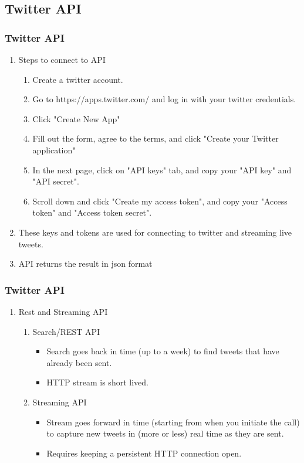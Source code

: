 \documentclass{beamer}
\begin{document}
\subsection{Twitter API}
\begin{frame}
\frametitle{Twitter API}
\begin{enumerate}
\item Steps to connect to API
\begin{enumerate}[I]
\item Create a twitter account.
\item Go to https://apps.twitter.com/ and log in with your twitter credentials.
\item Click "Create New App"
\item Fill out the form, agree to the terms, and click "Create your Twitter application"
\item In the next page, click on "API keys" tab, and copy your "API key" and "API secret".
\item Scroll down and click "Create my access token", and copy your "Access token" and "Access token secret".
\end{enumerate}
\item These keys and tokens are used for connecting to twitter and streaming live tweets.
\item API returns the result in json format
\end{enumerate}
\end{frame}

\begin{frame}
\frametitle{Twitter API}
\begin{enumerate}
\item Rest and Streaming API 
\begin{enumerate}       
\item Search/REST API
\begin{itemize}
\item Search goes back in time (up to a week) to find tweets that have already been sent.
\item  HTTP stream is short lived.
\end{itemize}

\item Streaming API
\begin{itemize}
\item Stream goes forward in time (starting from when you initiate the call) to capture new tweets in (more or less) real time as they are sent.        
\item Requires keeping a persistent HTTP connection open. 
\end{itemize}
\end{enumerate}
\end{enumerate}
\end{frame}
\end{document}
